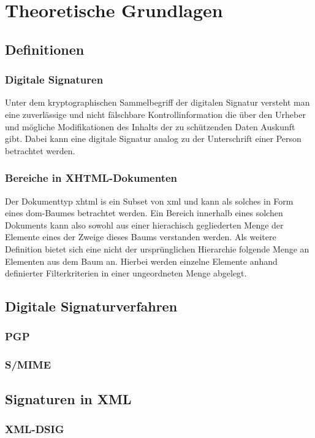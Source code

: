 \chapter{Theoretische Grundlagen}
\label{chp:TheoretischeGrundlagen}

\section{Definitionen}

\subsection{Digitale Signaturen}
Unter dem kryptographischen Sammelbegriff der digitalen Signatur versteht man eine zuverlässige und nicht fälschbare Kontrollinformation die über den Urheber
und mögliche Modifikationen des Inhalts der zu schützenden Daten Auskunft gibt\cite{itgk:bsi}. Dabei kann eine digitale Signatur analog zu der Unterschrift einer Person betrachtet werden\cite{kits}. 

\subsection{Bereiche in XHTML-Dokumenten}
Der Dokumenttyp \gls{xhtml} is ein Subset von \gls{xml} und kann als solches in Form eines \gls{dom}-Baumes betrachtet werden. Ein Bereich innerhalb eines
solchen Dokuments kann also sowohl aus einer hierachisch gegliederten Menge der Elemente eines der Zweige dieses Baums verstanden werden. Als weitere Definition
bietet sich eine nicht der ursprünglichen Hierarchie folgende Menge an Elementen aus dem Baum an. Hierbei werden einzelne Elemente anhand definierter
Filterkriterien in einer ungeordneten Menge abgelegt.


\section{Digitale Signaturverfahren}
\label{sec:thg:dsv}


\subsection{PGP}
\label{sec:thg:dsv:pgp}

\subsection{S/MIME}
\label{sec:thg:dsv:smime}


\section{Signaturen in XML}
\label{sec:thg:xml}


\subsection{XML-DSIG}
\label{sec:thg:xml:dsig}
